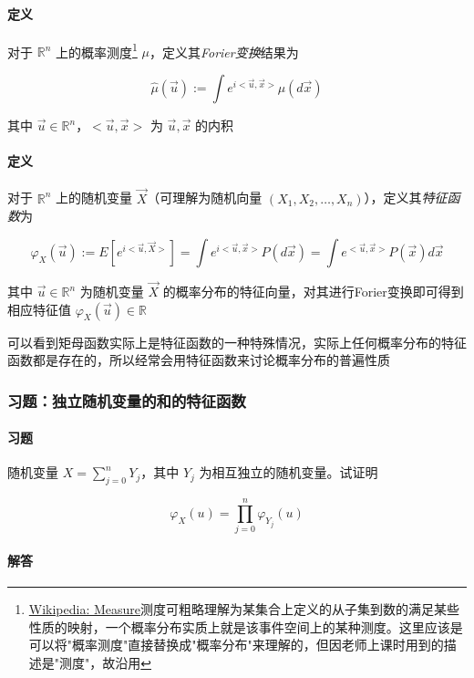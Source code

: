 \documentclass[a4paper, 11pt]{article} %
\begin{document}
\paragraph{定义}

对于 $\mathbb{R}^n$ 上的概率测度\footnote{\href{https://en.wikipedia.org/wiki/Measure_(mathematics)}{Wikipedia: Measure}\quad 测度可粗略理解为某集合上定义的从子集到数的满足某些性质的映射，一个概率分布实质上就是该事件空间上的某种测度。这里应该是可以将"概率测度"直接替换成"概率分布"来理解的，但因老师上课时用到的描述是"测度"，故沿用} $\mu$，定义其\emph{Forier变换}结果为

\begin{equation*}
	\hat{\mu}(\vec{u}):=\int e^{i<\vec{u},\vec{x}>}\mu(d\vec{x})
\end{equation*}

其中 $\vec{u}\in\mathbb{R}^n$，$<\vec{u},\vec{x}>$ 为 $\vec{u},\vec{x}$ 的内积

\paragraph{定义}

对于 $\mathbb{R}^n$ 上的随机变量 $\vec{X}$（可理解为随机向量 $(X_1,X_2,\dots,X_n)$），定义其\emph{特征函数}为

$$
\varphi_X(\vec{u}):=E[e^{i<\vec{u},\vec{X}>}]=\int e^{i<\vec{u},\vec{x}>}P(d\vec{x})=\int e^{<\vec{u},\vec{x}>}P(\vec{x})d\vec{x}
$$

其中 $\vec{u}\in\mathbb{R}^n$ 为随机变量 $\vec{X}$ 的概率分布的特征向量，对其进行Forier变换即可得到相应特征值 $\varphi_X(\vec{u})\in\mathbb{R}$

可以看到矩母函数实际上是特征函数的一种特殊情况，实际上任何概率分布的特征函数都是存在的，所以经常会用特征函数来讨论概率分布的普遍性质

\subsubsection{习题：独立随机变量的和的特征函数}

\paragraph{习题}

随机变量 $X=\sum\limits_{j=0}^nY_j$，其中 $Y_j$ 为相互独立的随机变量。试证明 

$$
\varphi_X(u)=\prod\limits_{j=0}^n\varphi_{Y_j}(u)
$$

\paragraph{解答}
\end{document}
